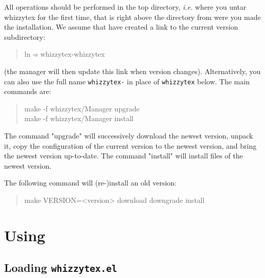 \documentclass[12pt]{article}
\begin{document}
All operations should be performed in the {\whizzy} top directory, {\em
i.e.} where you untar whizzytex for the first time, that is right above the
directory from were you made the installation. We assume that have 
created a link to the current version subdirectory: 
\begin{quote}
\begin{tt}
ln -s whizzytex-\version\space whizzytex
\end{tt}
\end{quote}
(the manager will then update this link when version changes).
Alternatively, you can also use the full name {\tt whizzytex-\version} in
place of {\tt whizzytex} below. The main commands are:
\begin{quote}
\begin{tt}
make -f whizzytex/Manager upgrade \\
make -f whizzytex/Manager install
\end{tt}
\end{quote}
The command \lst"upgrade" will successively download the newest version,
unpack it, copy the configuration of the current version to the newest
version, and bring the newest version up-to-date. The command \lst"install"
will install files of the newest version. 

The following command will (re-)install an old version:
\begin{quote}
\begin{tt}
make VERSION=<version> download downgrade install
\end{tt}
\end{quote}

\section{Using {\protect\whizzy}}
\label{using}

\subsection {Loading {\tt whizzytex.el}}
\end{document}

